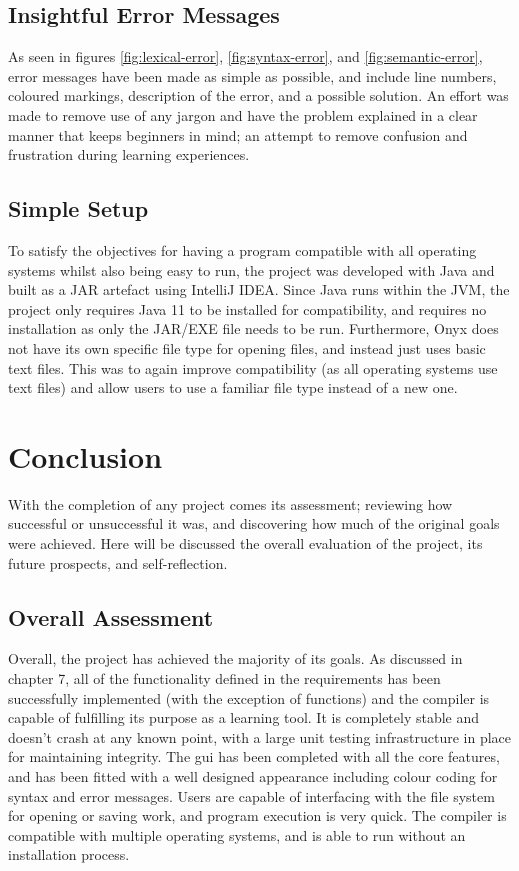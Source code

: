 \documentclass[
]{report}
\begin{document}
\section{Insightful Error Messages}
As seen in figures \ref{fig:lexical-error}, \ref{fig:syntax-error},
and \ref{fig:semantic-error}, error messages have been made
as simple as possible, and include line numbers, coloured markings, description
of the error, and a possible solution. An effort was made to remove use of any
jargon and have the problem explained in a clear manner that keeps beginners in mind;
an attempt to remove confusion and frustration during learning experiences.

\section{Simple Setup}
To satisfy the objectives for having a program compatible with all
operating systems whilst also being easy to run, the project was
developed with Java and built as a JAR artefact using IntelliJ IDEA.
Since Java runs within the JVM, the project only requires Java 11 to be
installed for compatibility, and requires no installation as only the
JAR/EXE file needs to be run. Furthermore, Onyx does not have its own
specific file type for opening files, and instead just uses basic text
files. This was to again improve compatibility (as all operating
systems use text files) and allow users to use a familiar file type
instead of a new one.

\chapter{Conclusion}
With the completion of any project comes its assessment; reviewing how
successful or unsuccessful it was, and discovering how much of the
original goals were achieved. Here will be discussed the overall
evaluation of the project, its future prospects, and self-reflection.

\section{Overall Assessment}
Overall, the project has achieved the majority of its goals. As
discussed in chapter 7, all of the functionality defined in the
requirements has been successfully implemented (with the exception of
functions) and the compiler is capable of fulfilling its purpose as a
learning tool. It is completely stable and doesn't crash at any known
point, with a large unit testing infrastructure in place for maintaining
integrity. The \acrshort{gui} has been completed with all the core features, and
has been fitted with a well designed appearance including colour coding
for syntax and error messages. Users are capable of interfacing with the
file system for opening or saving work, and program execution is very
quick. The compiler is compatible with multiple operating systems, and
is able to run without an installation process.
\end{document}
